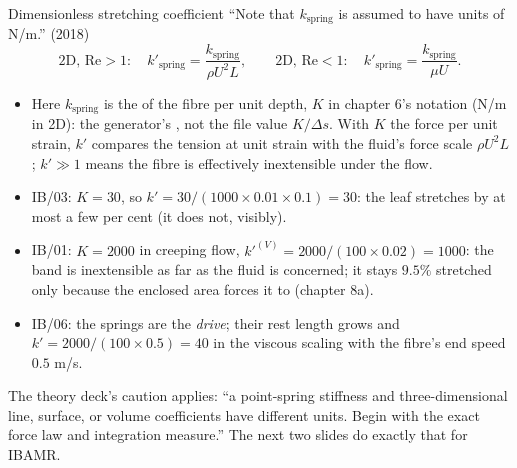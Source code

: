 \documentclass[aspectratio=169,11pt]{beamer}
\begin{document}
\begin{frame}{Dimensionless stretching coefficient}
\label{fr:kspring}
\small ``Note that $k_{\mathrm{spring}}$ is assumed to have units of N/m.'' (2018)
\[
  \text{2D, } \mathrm{Re} > 1:\quad k'_{\mathrm{spring}} = \frac{k_{\mathrm{spring}}}{\rho U^2 L}, \qquad
  \text{2D, } \mathrm{Re} < 1:\quad k'_{\mathrm{spring}} = \frac{k_{\mathrm{spring}}}{\mu U}.
\]
\begin{itemize}\footnotesize
  \item Here $k_{\mathrm{spring}}$ is the  of the fibre per unit depth, $K$ in chapter 6's notation (N/m in 2D): the generator's , not the file value $K/\Delta s$. With $K$ the force per unit strain, $k'$ compares the tension at unit strain with the fluid's force scale $\rho U^2 L$; $k' \gg 1$ means the fibre is effectively inextensible under the flow.
  \item IB/03: $K = 30$, so $k' = 30/(1000\times0.01\times0.1) = 30$: the leaf stretches by at most a few per cent (it does not, visibly).
  \item IB/01: $K = 2000$ in creeping flow, $k'^{(V)} = 2000/(100\times0.02) = 1000$: the band is inextensible as far as the fluid is concerned; it stays $9.5\%$ stretched only because the enclosed area forces it to (chapter 8a).
  \item IB/06: the springs are the \emph{drive}; their rest length grows and $k' = 2000/(100\times0.5) = 40$ in the viscous scaling with the fibre's end speed $0.5$ m/s.
\end{itemize}
\footnotesize The theory deck's caution applies: ``a point-spring stiffness and three-dimensional line, surface, or volume coefficients have different units. Begin with the exact force law and integration measure.'' The next two slides do exactly that for IBAMR.
\end{frame}
\end{document}
